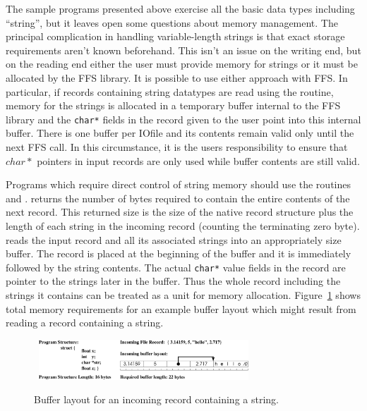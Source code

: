 The sample programs presented above exercise all the basic data types
including ``string'', but it leaves open some questions about memory
management.  The principal complication in handling variable-length strings
is that exact storage requirements aren't known beforehand.  This isn't an
issue on the writing end, but on the reading end either the user must
provide memory for strings or it must be allocated by the FFS library.  It
is possible to use either approach with FFS.  In particular, if records
containing string datatypes are read using the 
routine, memory for the strings is allocated in a temporary buffer internal
to the FFS library and the {\tt char*} fields in the record given to the
user point into this internal buffer.  There is one buffer per IOfile and
its contents remain valid only until the next FFS call.  In this
circumstance, it is the users responsibility to ensure that $char*$ pointers
in input records are only used while buffer contents are still valid.

Programs which require direct control of string memory should use the
routines  and
.  
returns the number of bytes required to contain the entire contents of the
next record.  This returned size is the size of the native record structure
plus the length of each string in the incoming record (counting the
terminating zero byte).   reads the
input record and all its associated strings into an appropriately size
buffer.  The record is placed at the beginning of the buffer and it is
immediately followed by the string contents.  The actual {\tt char*} value
fields in the record are pointer to the strings later in the buffer.  Thus
the whole record including the strings it contains can be treated as a unit
for memory allocation.  Figure~\ref{string_mem} shows total memory
requirements for an example buffer layout which might result from reading a
record containing a string.
\begin{figure}[tb]
\begin{center}\
\includegraphics[width=0.7\textwidth]{string_mem.pdf}
\caption{Buffer layout for an incoming record containing a
string.\label{string_mem}} 
\end{center}
\end{figure}
